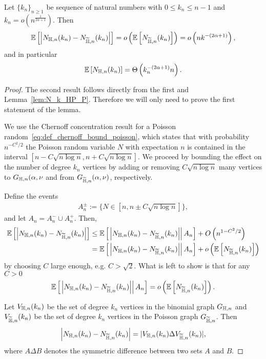 \begin{lemma}\label{lem:diff_Nk_hyperbolic_binomial_poisson}
Let $\{k_n\}_{n \ge 1}$ be sequence of natural numbers with $0 \leq k_n \leq n-1$ and $k_n = o(n^{\frac{1}{2\alpha+1}})$. Then
\[
	\mathbb{E}\left[\left|N_{\mathbb{H},n}(k_n)-N_{\widetilde{\mathbb{H}},n}(k_n)\right|\right] = o\left(\mathbb{E}\left[N_{\widetilde{\mathbb{H}},n}(k_n)\right]\right) = o\left(n k^{-(2\alpha+1)}\right),
\]
and in particular
\[
	\mathbb{E}\left[N_{\mathbb{H},n}(k_n)\right] = \Theta\left(k_n^{-(2\alpha + 1)} n\right).
\]
\end{lemma}
\begin{proof}
The second result follows directly from the first and Lemma~\ref{lem:N_k_HP_P}. Therefore we will only need to prove the first statement of the lemma.

We use the Chernoff concentration result for a Poisson random~\eqref{eq:def_chernoff_bound_poisson}, which states that with probability $n^{-C^2/2}$ the Poisson random variable $N$ with expectation $n$ is contained in the interval $[n-C\sqrt{n\log n},n+C\sqrt{n \log n}]$. We proceed by bounding the effect on the number of degree $k_n$ vertices by adding or removing $C\sqrt{n\log n}$ many vertices to $G_{\mathbb{H},n}(\alpha,\nu$ and from $G_{\widetilde{\mathbb{H}},n}(\alpha,\nu)$, respectively.

Define the events
\begin{align*}
	A_n^{\pm} := \{N \in [n, n \pm C\sqrt{n \log n}]\},
\end{align*}
and let $A_n = A_n^{-} \cup A_n^{+}$. Then,
\begin{align*}
\mathbb{E}\left[\left|N_{\mathbb{H},n}(k_n)-N_{\widetilde{\mathbb{H}},n}(k_n)\right|\right] 
&\le \mathbb{E}\left[\left.\left|N_{\mathbb{H},n}(k_n)-N_{\widetilde{\mathbb{H}},n}(k_n)\right|\right|A_n\right] + O\left(n^{1 - C^2/2}\right)\\
&= \mathbb{E}\left[\left.\left|N_{\mathbb{H},n}(k_n)-N_{\widetilde{\mathbb{H}},n}(k_n)\right|\right|A_n\right] + o\left(\mathbb{E}\left[N_{\widetilde{\mathbb{H}},n}(k_n)\right]\right)
\end{align*}
by choosing $C$ large enough, e.g. $C > \sqrt{2}$. What is left to show is that for any $C > 0$
\[
	 \mathbb{E}\left[\left.\left|N_{\mathbb{H},n}(k_n)-N_{\widetilde{\mathbb{H}},n}(k_n)\right|\right|A_n\right] = o\left(\mathbb{E}\left[N_{\widetilde{\mathbb{H}},n}(k_n)\right]\right).
\]

Let $V_{\mathbb{H},n}(k_n)$ be the set of degree $k_n$ vertices in the binomial graph $G_{\mathbb{H},n}$ and $V_{\widetilde{\mathbb{H}},n}(k_n)$ be the set of degree $k_n$ vertices in the Poisson graph $G_{\widetilde{\mathbb{H}},n}$. Then 
\[
	\left|N_{\mathbb{H},n}(k_n)-N_{\widetilde{\mathbb{H}},n}(k_n)\right| = |V_{\mathbb{H},n}(k_n) \Delta V_{\widetilde{\mathbb{H}},n}(k_n)|, 
\]
where $A \Delta B$ denotes the symmetric difference between two sets $A$ and $B$.


\end{proof}
